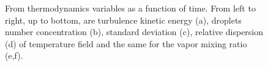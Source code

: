 \begin{figure}[!htbp]\ContinuedFloat\centering
{}
\end{figure}

\begin{figure}[!htbp]\ContinuedFloat\centering
{}
\caption{From thermodynamics variables as a function of time. From left to right, 
up to bottom, are turbulence kinetic energy (a), droplets number 
concentration (b), standard deviation (c), relative dispersion (d) of 
temperature field and the same for the vapor mixing ratio (e,f).}\label{fig:therm_dynam} 
\end{figure}

